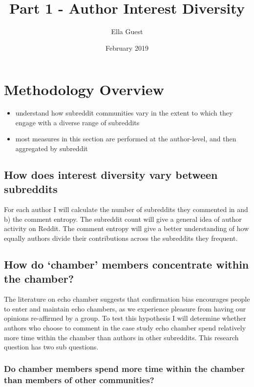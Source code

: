 \documentclass{article}
\title{Part 1 - Author Interest Diversity}
\author{Ella Guest}
\date{February 2019}
\begin{document}
\maketitle

\tableofcontents

\listoffigures
 
\listoftables

\section{Methodology Overview}
\begin{itemize}
    \item understand how subreddit communities vary in the extent to which they engage with a diverse range of subreddits
    \item most measures in this section are performed at the author-level, and then aggregated by subreddit
\end{itemize}


\subsection{How does interest diversity vary between subreddits }
For each author I will calculate the number of subreddits they commented in and b) the comment entropy. The subreddit count will give a general idea of author activity on Reddit. The comment entropy will give a better understanding of how equally authors divide their contributions across the subreddits they frequent.


\subsection{How do ‘chamber’ members concentrate within the chamber?}

The literature on echo chamber suggests that confirmation bias encourages people to enter and maintain echo chambers, as we experience pleasure from having our opinions re-affirmed by a group. To test this hypothesis I will determine whether authors who choose to comment in the case study echo chamber spend relatively more time within the chamber than authors in other subreddits. This research question has two sub questions.

\subsubsection{Do chamber members spend more time within the chamber than members of other communities?}
\end{document}
